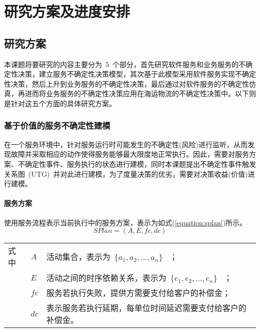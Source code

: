 

\section{研究方案及进度安排}

\subsection{研究方案}

本课题将要研究的内容主要分为~5~个部分，首先研究软件服务和业务服务的不确定性决策，建立服务不确定性决策模型，其次基于此模型采用软件服务实现不确定性决策，然后上升到业务服务的不确定性决策，最后通过对软件服务的不确定性仿真，再进而将业务服务的不确定性决策应用在海运物流的不确定性决策中。以下则是针对这五个方面的具体研究方案。

\subsubsection{基于价值的服务不确定性建模} \label{sec:model_section}

在一个服务环境中，针对服务运行时可能发生的不确定性(风险)进行监听，从而发现故障并采取相应的动作使得服务能够最大限度地正常执行。因此，需要对服务方案、不确定性事件、服务执行的状态进行建模，同时本课题提出不确定性事件触发关系图~(UTG)~并对此进行建模，为了度量决策的优劣，需要对决策收益(价值)进行建模。

\setcounter{paragraph}{0}
\paragraph{服务方案}

使用服务流程表示当前执行中的服务方案，表示为如式(\ref{equation:splan})所示。
\begin{equation}\label{equation:splan}
SPlan = \left( {A,E,fc,dc} \right)
\end{equation}
\begin{tabularx}{\textwidth}{@{}l@{\quad}l@{\pozhehao }X@{}}
    式中
    & ${A}$ & 活动集合，表示为~$\{{a_1}, {a_2},...,{a_n}\}$ ~； \\
    & ${E}$ & 活动之间的时序依赖关系，表示为~$\{{e_1}, {e_2},...,{e_n}\}$ ~；\\
    & ${fc}$ & 服务若执行失败，提供方需要支付给客户的补偿金；\\
    & ${dc}$ & 表示服务若执行延期，每单位时间延迟需要支付给客户的补偿金。
\end{tabularx}\vspace{\wordsep}

